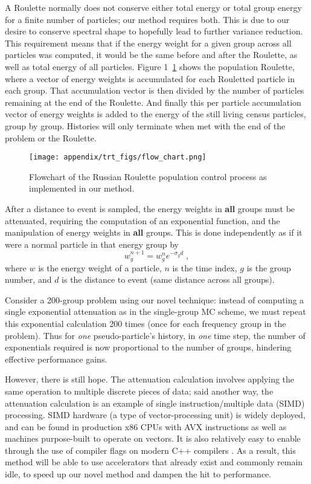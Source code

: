 A Roulette normally does not conserve either total energy or total group energy for a finite number of particles; our method requires both. 
This is due to our desire to conserve spectral shape to hopefully lead to further variance reduction.
This requirement means that if the energy weight for a given group across all particles was computed, it would be the same before and after the Roulette, as well as total energy of all particles.
Figure 1~\ref{fig:roulette} shows the population Roulette, where a vector of energy weights is accumulated for each Rouletted particle in each group. That accumulation vector is then divided by the number of particles remaining at the end of the Roulette. And finally this per particle accumulation vector of energy weights is added to the energy of the still living census particles, group by group.
Histories will only terminate when met with the end of the problem or the Roulette.

\begin{figure}
    \begin{center}
        \texttt{[image: appendix/trt\_figs/flow\_chart.png]}
        \caption{Flowchart of the Russian Roulette population control process as implemented in our method.}
        \label{fig:roulette}
    \end{center}
\end{figure}

After a distance to event is sampled, the energy weights in \textbf{all} groups must be attenuated, requiring the computation of an exponential function, and the manipulation of energy weights in \textbf{all} groups.
This is done independently as if it were a normal particle in that energy group by
\begin{equation}
    w_g^{n+1} = w_g^n e^{-\sigma_g  d} \;,
\end{equation}
where $w$ is the energy weight of a particle, $n$ is the time index, $g$ is the group number, and $d$ is the distance to event (same distance across all groups).

Consider a 200-group problem using our novel technique: instead of computing a single exponential attenuation as in the single-group MC scheme, we must repeat this exponential calculation 200 times (once for each frequency group in the problem).
Thus for \textit{one} pseudo-particle's history, in \textit{one} time step, the number of exponentials required is now proportional to the number of groups, hindering effective performance gains.

However, there is still hope.
The attenuation calculation involves applying the same operation to multiple discrete pieces of data; said another way, the attenuation calculation is an example of single instruction/multiple data (SIMD) processing.
SIMD hardware (a type of vector-processing unit) is widely deployed, and can be found in production x86 CPUs with AVX instructions as well as machines purpose-built to operate on vectors. 
It is also relatively easy to enable through the use of compiler flags on modern C++ compilers \cite{OpenMP2018}. 
As a result, this method will be able to use accelerators that already exist and commonly remain idle, to speed up our novel method and dampen the hit to performance.

